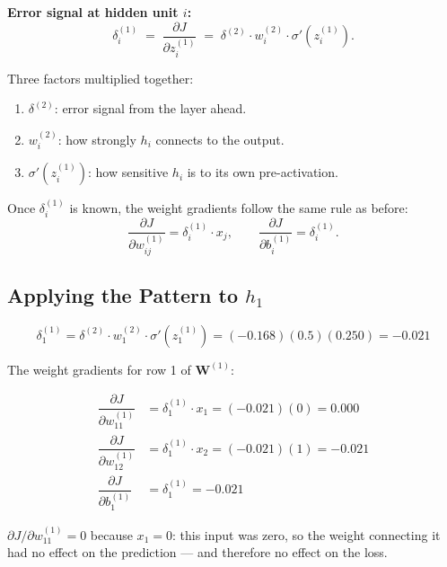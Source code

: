 \documentclass[12pt, a4paper]{article}
\newif\ifstudentmode
\newcommand{\sol}[2][6cm]{%
  \ifstudentmode
    \underline{\hspace{#1}}%
  \else
    {#2}%
  \fi
}
\theoremstyle{definition}
\newcommand{\sigmoid}{\sigma}
\newcommand{\bW}{\mathbf{W}}
\newcommand{\pd}[2]{\dfrac{\partial #1}{\partial #2}}
\begin{document}
\begin{patternbox}
\textbf{Error signal at hidden unit $i$:}
\[
  \delta^{(1)}_i
  \;=\; \pd{J}{z^{(1)}_i}
  \;=\; \delta^{(2)}
        \cdot w^{(2)}_i
        \cdot \sigmoid'\!\left(z^{(1)}_i\right).
\]

Three factors multiplied together:
\begin{enumerate}[nosep]
  \item $\delta^{(2)}$: error signal from the layer ahead.
  \item $w^{(2)}_i$: how strongly $h_i$ connects to the output.
  \item $\sigmoid'(z^{(1)}_i)$: how sensitive $h_i$ is to its own
        pre-activation.
\end{enumerate}

Once $\delta^{(1)}_i$ is known, the weight gradients follow the same rule
as before:
\[
  \pd{J}{w^{(1)}_{ij}} = \delta^{(1)}_i \cdot x_j, \qquad
  \pd{J}{b^{(1)}_i}    = \delta^{(1)}_i.
\]
\end{patternbox}

\vspace{0.8em}

\subsection{Applying the Pattern to $h_1$}

\[
  \delta^{(1)}_1
  = \delta^{(2)} \cdot w^{(2)}_1 \cdot \sigmoid'(z^{(1)}_1)
  = (-0.168)(0.5)(0.250)
  = \sol[3cm]{-0.021}
\]

The weight gradients for row 1 of $\bW^{(1)}$:

\begin{align*}
  \pd{J}{w^{(1)}_{11}} &= \delta^{(1)}_1 \cdot x_1 = (-0.021)(0) = \sol[2.5cm]{0.000} \\[4pt]
  \pd{J}{w^{(1)}_{12}} &= \delta^{(1)}_1 \cdot x_2 = (-0.021)(1) = \sol[2.5cm]{-0.021} \\[4pt]
  \pd{J}{b^{(1)}_1}    &= \delta^{(1)}_1 = \sol[2.5cm]{-0.021}
\end{align*}

\begin{notebox}
$\partial J / \partial w^{(1)}_{11} = 0$ because $x_1 = 0$: this input was
zero, so the weight connecting it had no effect on the prediction --- and
therefore no effect on the loss.
\end{notebox}
\end{document}
